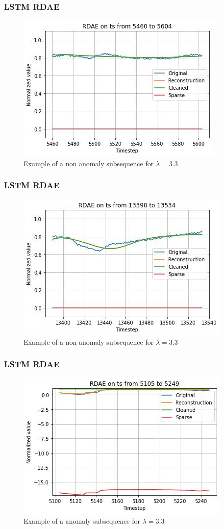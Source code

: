 \documentclass{beamer}
\theoremstyle{plain}
\theoremstyle{definition}
\theoremstyle{remark}
\begin{document}
\begin{frame}
	\frametitle{LSTM RDAE}
	\begin{figure}
		\centering
		\includegraphics[width=0.7\linewidth]{Images/LSTMlam3.3ts_non_anomaly5460.jpg}
		\caption[]{Example of a non anomaly subsequence for $\lambda=3.3$}
	\end{figure}
\end{frame}

\begin{frame}
	\frametitle{LSTM RDAE}
	\begin{figure}
		\centering
		\includegraphics[width=0.7\linewidth]{Images/LSTMlam3.3ts_non_anomaly13390.jpg}
		\caption[]{Example of a non anomaly subsequence for $\lambda=3.3$}
	\end{figure}
\end{frame}

\begin{frame}
	\frametitle{LSTM RDAE}
	\begin{figure}
		\centering
		\includegraphics[width=0.7\linewidth]{Images/LSTMlam3.3ts_anomaly5105.jpg}
		\caption[]{Example of a anomaly subsequence for $\lambda=3.3$}
	\end{figure}
\end{frame}
\end{document}

